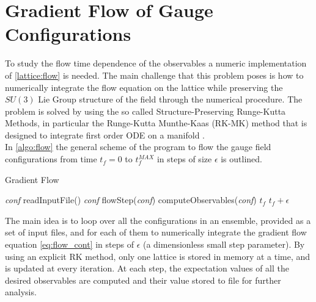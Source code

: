\section{Gradient Flow of Gauge Configurations}
To study the flow time dependence of the observables a numeric implementation of \cref{lattice:flow} is needed. The main challenge that this problem poses is how to numerically integrate the flow equation on the lattice while preserving the $SU(3)$ Lie Group structure of the field through the numerical procedure. The problem is solved by using the so called Structure-Preserving Runge-Kutta Methods, in particular the Runge-Kutta Munthe-Kaas (RK-MK) method that is designed to integrate first order ODE on a manifold \cite{munthe-kaas_runge-kutta_1998,munthe-kaas_lie-butcher_1995,celledoni_introduction_2014}. \\
In \cref{algo:flow} the general scheme of the program to flow the gauge field configurations from time $t_f=0$ to $t_f^{MAX}$ in steps of size $\epsilon$ is outlined.
\begin{algorithm}[bht!]
    \caption{Gradient Flow}\label{algo:flow}
    \begin{algorithmic}[1]
        \State \textit{conf} \gets readInputFile()     
            \State \textit{conf} \gets flowStep(\textit{conf})
            \State computeObservables(\textit{conf}) 
            \State $t_f$ \gets $t_f + \epsilon$
        \EndFor
    \EndFor
\end{algorithmic}
\end{algorithm}

The main idea is to loop over all the configurations in an ensemble, provided as a set of input files, and for each of them to numerically integrate the gradient flow equation \cref{eq:flow_cont} in steps of $\epsilon$ (a dimensionless small step parameter). By using an explicit RK method, only one lattice is stored in memory at a time, and is updated at every iteration. At each step, the expectation values of all the desired observables are computed and their value stored to file for further analysis.

